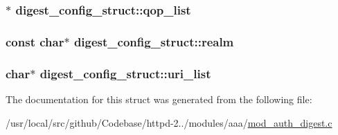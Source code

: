 \subsubsection[{\texorpdfstring{qop\+\_\+list}{qop_list}}]{$\ast$ digest\+\_\+config\+\_\+struct\+::qop\+\_\+list}\hypertarget{structdigest__config__struct_ac689b01e93609d2089a5719ffa7d53bf}{}\label{structdigest__config__struct_ac689b01e93609d2089a5719ffa7d53bf}
\subsubsection[{\texorpdfstring{realm}{realm}}]{\setlength{\rightskip}{0pt plus 5cm}const char$\ast$ digest\+\_\+config\+\_\+struct\+::realm}\hypertarget{structdigest__config__struct_a3de3fdaa304b0e6881c86e51805ffaee}{}\label{structdigest__config__struct_a3de3fdaa304b0e6881c86e51805ffaee}
\subsubsection[{\texorpdfstring{uri\+\_\+list}{uri_list}}]{\setlength{\rightskip}{0pt plus 5cm}char$\ast$ digest\+\_\+config\+\_\+struct\+::uri\+\_\+list}\hypertarget{structdigest__config__struct_a8989474a0b2dd4357822f9dffd288870}{}\label{structdigest__config__struct_a8989474a0b2dd4357822f9dffd288870}


The documentation for this struct was generated from the following file\+:\begin{DoxyCompactItemize}
\item 
/usr/local/src/github/\+Codebase/httpd-\/2../modules/aaa/\hyperlink{mod__auth__digest_8c}{mod\+\_\+auth\+\_\+digest.\+c}\end{DoxyCompactItemize}
